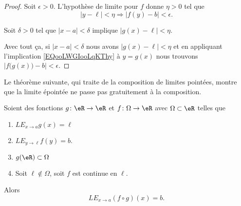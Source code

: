 \begin{proof}
	Soit \( \epsilon>0\). L'hypothèse de limite pour \( f\) donne \( \eta>0\) tel que
	\begin{equation}        \label{EQooLWGIooLqKThy}
		| y-\ell |<\eta \Rightarrow | f(y)-b |<\epsilon.
	\end{equation}

	Soit \( \delta>0\) tel que \( | x-a |<\delta\) implique \( | g(x)-\ell |<\eta\).

	Avec tout ça, si \( | x-a |<\delta\) nous avons \( | g(x)-\ell |<\eta\) et en appliquant l'implication \eqref{EQooLWGIooLqKThy} à \( y=g(x)\) nous trouvons \( | f\big( g(x) \big)-b |<\epsilon\).
\end{proof}

Le théorème suivante, qui traite de la composition de limites pointées, montre que la limite épointée ne passe pas gratuitement à la composition.
\begin{theorem}     \label{THOooNPBQooEMOYpd}
	Soient des fonctions \( g\colon \eR\to \eR\) et \( f\colon \Omega\to \eR\) avec \( \Omega\subset \eR\) telles que
	\begin{enumerate}
		\item
		      \( {LE}_{x\to a}g(x)=\ell\)
		\item
		      \( {LE}_{y\to \ell}f(y)=b\).
		\item
		      \( g(\eR)\subset \Omega\)
		\item       \label{ITEMooUNJAooCDOKcO}
		      Soit \( \ell\notin \Omega\), soit \( f\) est continue en \( \ell\).
	\end{enumerate}
	Alors
	\begin{equation}        \label{EQooTHTVooCvrFdN}
		{LE}_{x\to a}(f\circ g)(x)=b.
	\end{equation}
\end{theorem}

